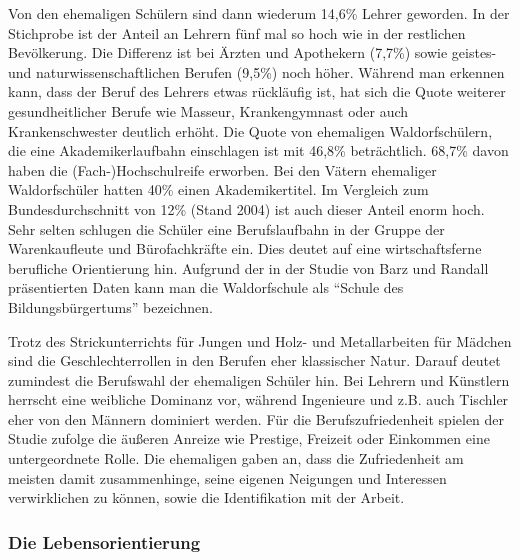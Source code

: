 Von den ehemaligen Schülern sind dann wiederum 14,6\% Lehrer geworden. 
In der Stichprobe ist der Anteil an Lehrern fünf mal so hoch wie in der restlichen Bevölkerung. 
Die Differenz ist bei Ärzten und Apothekern (7,7\%) sowie geistes- und naturwissenschaftlichen Berufen (9,5\%) noch höher. 
Während man erkennen kann, dass der Beruf des Lehrers etwas rückläufig ist, hat sich die Quote weiterer gesundheitlicher Berufe wie Masseur, Krankengymnast oder auch Krankenschwester deutlich erhöht. 
Die Quote von ehemaligen Waldorfschülern, die eine Akademikerlaufbahn einschlagen ist mit 46,8\% beträchtlich. 
68,7\% davon haben die (Fach-)Hochschulreife erworben. Bei den Vätern ehemaliger Waldorfschüler hatten 40\% einen Akademikertitel. 
Im Vergleich zum Bundesdurchschnitt von 12\% (Stand 2004) ist auch dieser Anteil enorm hoch. 
Sehr selten schlugen die Schüler eine Berufslaufbahn in der Gruppe der Warenkaufleute und Bürofachkräfte ein. 
Dies deutet auf eine wirtschaftsferne berufliche Orientierung hin. 
Aufgrund der in der Studie von Barz und Randall präsentierten Daten kann man die Waldorfschule als \enquote{Schule des Bildungsbürgertums} bezeichnen. \citep[][S. 17]{randoll07} 

Trotz des Strickunterrichts für Jungen und Holz- und Metallarbeiten für Mädchen sind die Geschlechterrollen in den Berufen eher klassischer Natur. 
Darauf deutet zumindest die Berufswahl der ehemaligen Schüler hin. 
Bei Lehrern und Künstlern herrscht eine weibliche Dominanz vor, während Ingenieure und z.B. auch Tischler eher von den Männern dominiert werden. 
Für die Berufszufriedenheit spielen der Studie zufolge die äußeren Anreize wie Prestige, Freizeit oder Einkommen eine untergeordnete Rolle. 
Die ehemaligen gaben an, dass die Zufriedenheit am meisten damit zusammenhinge, seine eigenen Neigungen und Interessen verwirklichen zu können, sowie die Identifikation mit der Arbeit. 

\subsubsection{Die Lebensorientierung}
\label{subsub:lebensorientierung}

